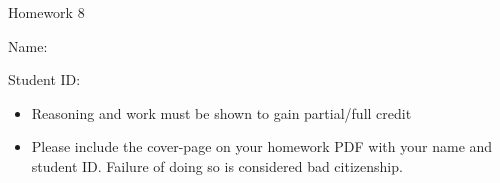\documentclass[11pt]{exam}
\begin{document}
\centerline{\Large \sc Homework 8}
\pagestyle{empty}

\hrulefill

\vspace{2cm}


{\Large \sc Name:}



\vspace{2cm}



{\Large \sc Student ID:}

\vspace{6cm}

\begin{itemize}
  \item Reasoning and work must be shown to gain partial/full
  credit
  \item Please include the cover-page on your homework PDF with your name and student ID. Failure of doing so is considered bad citizenship. 

 \end{itemize}
\end{document}
